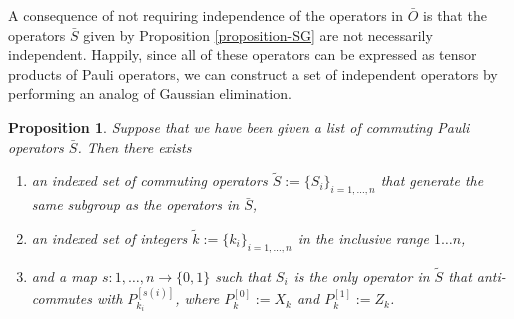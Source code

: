 \documentclass[twocolumn,showpacs,preprintnumbers,amsmath,amssymb,nofootinbib,pra,floatfix]{revtex4}
\newtheorem{proposition}{Proposition}
\newenvironment{remark}[1][Remark]{\begin{trivlist}
\item[\hskip \labelsep {\bfseries #1}]}{\end{trivlist}}
\newcommand{\lst}{\bar}
\newcommand{\set}{\tilde}
\begin{document}
\begin{remark}
A consequence of not requiring independence of the operators in $\lst O$ is that the operators $\lst S$ given by Proposition \ref{proposition-SG} are not necessarily independent.  Happily, since all of these operators can be expressed as tensor products of Pauli operators, we can construct a set of independent operators by performing an analog of Gaussian elimination.
\end{remark}

\begin{proposition}
\label{make-independent-using-elimination}
Suppose that we have been given a list of commuting Pauli operators $\lst S$.  Then there exists
\begin{enumerate}
\item an indexed set of commuting operators $\set S := \{S_i\}_{i=1,\dots,n}$ that generate the same subgroup as the operators in $\lst S$,
\item an indexed set of integers $\set k := \{k_i\}_{i=1,\dots,n}$ in the inclusive range $1\dots n$,
\item and a map $s:1,\dots, n \to \{0,1\}$ such that $S_i$ is the only operator in $\set S$ that anti-commutes with $P_{k_i}^{[s(i)]}$, where $P_k^{[0]}:=X_k$ and $P_k^{[1]}:=Z_k$.
\end{enumerate}
\end{proposition}
\end{document}
